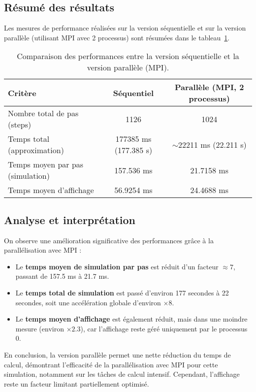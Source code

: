 \documentclass[a4paper,12pt]{article}
\begin{document}
\subsection{Résumé des résultats}

Les mesures de performance réalisées sur la version séquentielle et sur la version parallèle (utilisant MPI avec 2 processus) sont résumées dans le tableau~\ref{tab:comparaison_performances}.

\begin{table}[H]
    \centering
    \begin{tabular}{|l|c|c|}
        \hline
        \textbf{Critère} & \textbf{Séquentiel} & \textbf{Parallèle (MPI, 2 processus)} \\
        \hline
        Nombre total de pas (steps) & 1126 & 1024 \\
        \hline
        Temps total (approximation) & 177385 ms (177.385 s) & $\sim$22211 ms (22.211 s) \\
        \hline
        Temps moyen par pas (simulation) & 157.536 ms & 21.7158 ms \\
        \hline
        Temps moyen d'affichage & 56.9254 ms & 24.4688 ms \\
        \hline
    \end{tabular}
    \caption{Comparaison des performances entre la version séquentielle et la version parallèle (MPI).}
    \label{tab:comparaison_performances}
\end{table}

\subsection{Analyse et interprétation}

On observe une amélioration significative des performances grâce à la parallélisation avec MPI :
\begin{itemize}
    \item Le \textbf{temps moyen de simulation par pas} est réduit d'un facteur $\approx 7$, passant de 157.5 ms à 21.7 ms.
    \item Le \textbf{temps total de simulation} est passé d'environ 177 secondes à 22 secondes, soit une accélération globale d'environ $\times 8$.
    \item Le \textbf{temps moyen d'affichage} est également réduit, mais dans une moindre mesure (environ $\times 2.3$), car l'affichage reste géré uniquement par le processus 0.
\end{itemize}

En conclusion, la version parallèle permet une nette réduction du temps de calcul, démontrant l'efficacité de la parallélisation avec MPI pour cette simulation, notamment sur les tâches de calcul intensif. Cependant, l'affichage reste un facteur limitant partiellement optimisé.
\end{document}
